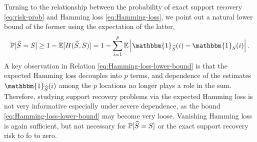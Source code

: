 \medskip

Turning to the relationship between the probability of exact support recovery \eqref{eq:risk-prob} and Hamming loss \eqref{eq:Hamming-loss}, we point out a natural lower bound of the former using the expectation of the latter,
\begin{equation} \label{eq:Hamming-loss-lower-bound}
    \mathbb{P}[\widehat S = S] 
    \ge 1 - \mathbb{E}[H(\widehat S, S)]
    = 1 - \sum\limits_{i=1}^p\E\left|\mathbbm{1}_{\widehat{S}}(i)- \mathbbm{1}_{S}(i)\right|.
\end{equation}
A key observation in Relation \eqref{eq:Hamming-loss-lower-bound} is that the expected Hamming loss decouples into $p$ terms, and dependence of the estimates $\mathbbm{1}_{\widehat{S}}(i)$ among the $p$ locations no longer plays a role in the sum.
Therefore, studying support recovery problems via the expected Hamming loss is not very informative especially under severe dependence, as the bound \eqref{eq:Hamming-loss-lower-bound} may become {very} loose.
Vanishing Hamming loss is again sufficient, but not necessary for 
$\P[\widehat{S}=S]$ or the exact support recovery risk to fo to zero.


